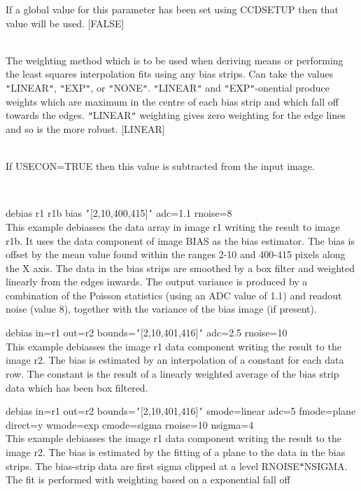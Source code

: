 \documentclass[twoside,11pt]{article}
\renewcommand{\_}{\texttt{\symbol{95}}}
\newcommand{\qt}[1]{{\tt "}#1{\tt "}}
\newcommand{\qs}[1]{{\tt '}#1{\tt '}}
\newcommand{\sstexamples}[1]{
   \item[Examples:] \mbox{} \\
   \vspace{-3.5ex}
   \begin{description}
      #1
   \end{description}
}
\newcommand{\sstsubsection}[1]{ \item[{#1}] \mbox{} \\}
\newcommand{\sstexamplesubsection}[2]{\sloppy \item{\ssttt #1} \mbox{} \\ #2 }
\newcommand{\sstexamples}[1]{
      \item[Examples:] \\
      \begin{description}
         #1
      \end{description}
      \\
   }
\newcommand{\sstsubsection}[1]{\item[{#1}]}
\newcommand{\sstexamplesubsection}[2]{\item[{\ssttt #1}] #2}
\begin{document}
{{{         If a global value for this parameter has been set using 
         CCDSETUP then that value will be used.
         [FALSE]
      }
      \sstsubsection{
         WMODE = LITERAL (Read)
      } {
         The weighting method which is to be used when deriving means
         or performing the least squares interpolation fits using any
         bias strips. Can take the values \qt{LINEAR}, \qt{EXP}, or \qt{NONE}.
         \qt{LINEAR} and \qt{EXP}-onential produce weights which are maximum
         in the centre of each bias strip and which fall off towards
         the edges. \qt{LINEAR} weighting gives zero weighting for the
         edge lines and so is the more robust.
         [LINEAR]
      }
      \sstsubsection{
         ZERO = \_DOUBLE (Read)
      } {
         If USECON=TRUE then this value is subtracted from the input
         image.
      }
   }
\newpage
   \sstexamples{
      \sstexamplesubsection{
         debias r1 r1b bias \qs{[2,10,400,415]} adc=1.1 rnoise=8
      } {
         This example debiasses the data array in image r1 writing the
         result to image r1b. It uses the data component of image BIAS as
         the bias estimator. The bias is offset by the mean value found
         within the ranges 2-10 and 400-415 pixels along the X axis.
         The data in the bias strips are smoothed by a box filter and
         weighted linearly from the edges inwards. The output variance
         is produced by a combination of the Poisson statistics (using
         an ADC value of 1.1) and readout noise (value 8), together
         with the variance of the bias image (if present).
      }
      \sstexamplesubsection{
         debias in=r1 out=r2 bounds=\qs{[2,10,401,416]} adc=2.5 rnoise=10
      } {
         This example debiasses the image r1 data component writing the
         result to the image r2. The bias is estimated by an interpolation
         of a constant for each data row. The constant is the result of
         a linearly weighted average of the bias strip data which has
         been box filtered.
      }
      \sstexamplesubsection{
         debias in=r1 out=r2 bounds=\qs{[2,10,401,416]} smode=linear adc=5
             fmode=plane direct=y wmode=exp cmode=sigma rnoise=10
             nsigma=4
      } {
         This example debiasses the image r1 data component writing the
         result to the image r2. The bias is estimated by the fitting of a
         plane to the data in the bias strips. The bias-strip data are
         first sigma clipped at a level RNOISE$*$NSIGMA. The fit is
         performed with weighting based on a exponential fall off
}}}
\end{document}
